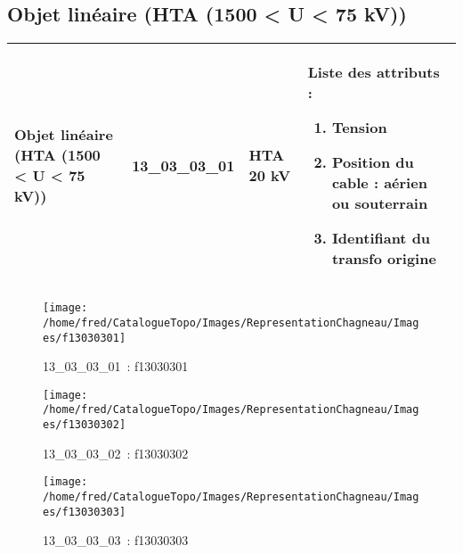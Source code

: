 \documentclass[12pt,titlepage]{book}
\begin{document}
\subsection{Objet linéaire (HTA (1500 < U < 75 kV))}
\noindent
\vspace{\baselineskip}

\renewcommand{\arraystretch}{1.2}
\begin{supertabular}{|p{10cm}|c|p{13cm}|p{12cm}|}
 Objet linéaire (HTA (1500 < U < 75 kV)) & 13\_03\_03\_01 & HTA 20 kV & Liste des attributs :
\begin{enumerate}
  \item Tension  \item Position du cable : aérien ou souterrain  \item Identifiant du transfo origine\end{enumerate}
\\
\hline
\end{supertabular}
\begin{figure}[h!]
  \hfill         %
  \begin{minipage}[t]{3cm}
    \begin{center}
      \texttt{[image: /home/fred/CatalogueTopo/Images/RepresentationChagneau/Images/f13030301]}
      \caption[~13\_03\_03\_01]{\small{13\_03\_03\_01~:} \tiny{f13030301}}\label{f13030301}
    \end{center}
  \end{minipage}
  \begin{minipage}[t]{3cm}
    \begin{center}
      \texttt{[image: /home/fred/CatalogueTopo/Images/RepresentationChagneau/Images/f13030302]}
      \caption[~13\_03\_03\_02]{\small{13\_03\_03\_02~:} \tiny{f13030302}}\label{f13030302}
    \end{center}
  \end{minipage}
  \begin{minipage}[t]{3cm}
    \begin{center}
      \texttt{[image: /home/fred/CatalogueTopo/Images/RepresentationChagneau/Images/f13030303]}
      \caption[~13\_03\_03\_03]{\small{13\_03\_03\_03~:} \tiny{f13030303}}\label{f13030303}
    \end{center}
  \end{minipage}
\end{figure}
\end{document}
